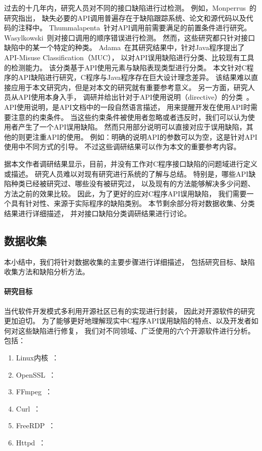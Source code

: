 过去的十几年内，研究人员对不同的接口缺陷进行过检测。
例如，Monperrus~\cite{13-tosem-missing-call}的研究指出，
缺失必要的API调用普遍存在于缺陷跟踪系统、论文和源代码以及代码的注释中。
Thummalapenta~\cite{09-icse-exception}针对API调用前需要满足的前置条件进行研究。
Wasylkowski~\cite{07-fse-object}则对接口调用的顺序错误进行检测。
然而，这些研究都只针对接口缺陷中的某一个特定的种类。
Adama~\cite{survey18}在其研究结果中，针对Java程序提出了API-Misuse Classification（MUC），
以对API误用缺陷进行分类、比较现有工具的检测能力。
该分类基于API使用元素与缺陷表现类型进行分类。
本文针对C程序的API缺陷进行研究，C程序与Java程序存在巨大设计理念差异。
该结果难以直接应用于本文研究内，但是对本文的研究就有重要参考意义。
另一方面，研究人员从API使用本身入手，
调研并给出针对于API使用说明（directive）的分类~\cite{09-icse-doc,12-ese-directive}。
API使用说明，是API文档中的一段自然语言描述，
用来提醒开发在使用API时需要注意的约束条件。
当这些约束条件被使用者忽略或者违反时，我们可以认为使用者产生了一个API误用缺陷。
然而只用部分说明可以直接对应于误用缺陷，其他的则更注重API的使用。
例如：明确的说明API的参数可以为空，这是针对API使用中不同方式的引导。
不过这些调研结果可以作为本文的重要参考内容。


据本文作者调研结果显示，目前，并没有工作对C程序接口缺陷的问题域进行定义或描述。
研究人员难以对现有研究进行系统的了解与总结。
特别是，哪些API缺陷种类已经被研究过、哪些没有被研究过，
以及现有的方法能够解决多少问题、方法之前的效果比较。
因此，为了更好的应对C程序API误用缺陷，
我们需要一个具有针对性、来源于实际程序的缺陷类别。
本节剩余部分将对数据收集、分类结果进行详细描述，
并对接口缺陷分类调研结果进行讨论。

\subsection{数据收集}
本小结中，我们将针对数据收集的主要步骤进行详细描述，
包括研究目标、缺陷收集方法和缺陷分析方法。

\paragraph{研究目标}
当代软件开发模式多利用开源社区已有的实现进行封装，
因此对开源软件的研究更加迫切。
为了能够更好地理解现实中C程序API误用缺陷的特点、以及开发者如何对这些缺陷进行修复，
我们对不同领域、广泛使用的六个开源软件进行分析。
包括：
\begin{enumerate}
	\item Linux内核~\cite{linux}：
	
	\item OpenSSL~\cite{openssl}：
	
	\item FFmpeg~\cite{ffmpeg}：
	
	\item Curl~\cite{curl}：
	
	\item FreeRDP~\cite{freerdp}：
	
	\item Httpd~\cite{httpd}：
\end{enumerate}

